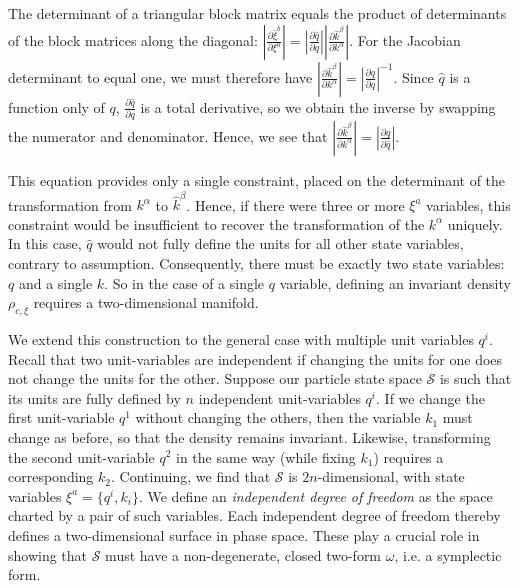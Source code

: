 \documentclass[12pt, english, twoside]{article} %
\begin{document}
\noindent
The determinant of a triangular block matrix equals the product of determinants of the block matrices along the diagonal: $ \left|\frac{\partial \hat{\xi}^b}{\partial \xi^a} \right| =  \left|\frac{\partial \hat{q}}{\partial q}\right| \left|\frac{\partial \hat{k}^\beta}{\partial k^\alpha}\right|$. For the Jacobian determinant to equal one, we must therefore have  $\left|\frac{\partial \hat{k}^\beta}{\partial k^\alpha} \right| =   \left|\frac{\partial \hat{q}}{\partial q}\right|^{-1}$. Since $\hat q$ is a function only of $q$, $\frac{\partial \hat{q}}{\partial q}$ is a total derivative, so we obtain the inverse by swapping the numerator and denominator. Hence, we see that $\left|\frac{\partial \hat{k}^\beta}{\partial k^\alpha} \right| = \left|\frac{\partial q}{\partial \hat q} \right|$. 

This equation provides only a single constraint, placed on the determinant of the transformation from $k^\alpha$ to $\hat{k}^\beta$. Hence, if there were three or more $\xi^a$ variables, this constraint would be insufficient to recover the transformation of the $k^\alpha$ uniquely. In this case, $\hat q$  would not fully define the units for all other state variables, contrary to assumption. Consequently, there must be exactly two state variables: $q$ and a single $k$. So in the case of a single $q$ variable, defining an invariant density $\rho_{c, \xi}$ requires a two-dimensional manifold.

We extend this construction to the general case with multiple unit variables $q^i$. Recall that two unit-variables are independent if changing the units for one does not change the units for the other. Suppose our particle state space $\mathcal{S}$ is such that its units are fully defined by $n$ independent unit-variables $q^i$. If we change the first unit-variable $q^1$ without changing the others, then the variable $k_1$ must change as before, so that the density remains invariant. Likewise, transforming the second unit-variable $q^2$ in the same way (while fixing $k_1$) requires a corresponding $k_2$. Continuing, we find that $\mathcal{S}$ is $2n$-dimensional, with state variables $\xi^a = \{ q^i, k_i \}$. We define an \textit{independent degree of freedom} as the space charted by a pair of such variables. Each independent degree of freedom thereby defines a two-dimensional surface in phase space. These play a crucial role in showing that $\mathcal{S}$ must have a non-degenerate, closed two-form $\omega$, i.e. a symplectic form. 
\end{document}
